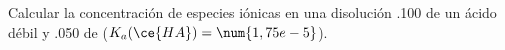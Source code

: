 Calcular la concentración de especies iónicas en una disolución \SI{,100}{\Molar} de un ácido débil  y \SI{,050}{\Molar} de  ($K_a(\ce{HA})=\num{1,75e-5}$).
